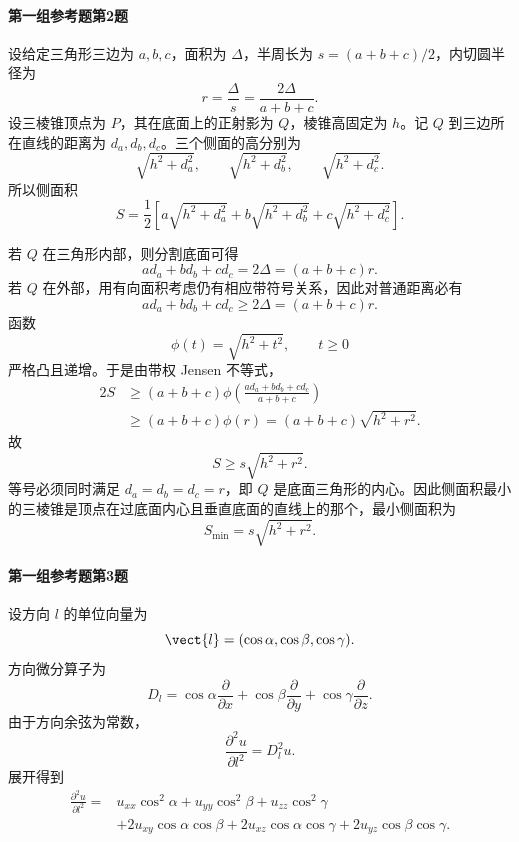 \paragraph{第一组参考题第2题}
\begin{xsolution}
设给定三角形三边为 $a,b,c$，面积为 $\Delta$，半周长为 $s=(a+b+c)/2$，内切圆半径为
\[
  r=\frac{\Delta}{s}=
  \frac{2\Delta}{a+b+c}.
\]
设三棱锥顶点为 $P$，其在底面上的正射影为 $Q$，棱锥高固定为 $h$。记 $Q$ 到三边所在直线的距离为 $d_a,d_b,d_c$。三个侧面的高分别为
\[
  \sqrt{h^2+d_a^2},
  \qquad
  \sqrt{h^2+d_b^2},
  \qquad
  \sqrt{h^2+d_c^2}.
\]
所以侧面积
\[
  S=\frac12\left[
  a\sqrt{h^2+d_a^2}
  +b\sqrt{h^2+d_b^2}
  +c\sqrt{h^2+d_c^2}
  \right].
\]

若 $Q$ 在三角形内部，则分割底面可得
\[
  ad_a+bd_b+cd_c=2\Delta=(a+b+c)r.
\]
若 $Q$ 在外部，用有向面积考虑仍有相应带符号关系，因此对普通距离必有
\[
  ad_a+bd_b+cd_c\ge2\Delta=(a+b+c)r.
\]
函数
\[
  \phi(t)=\sqrt{h^2+t^2},\qquad t\ge0
\]
严格凸且递增。于是由带权 Jensen 不等式，
\[
\begin{aligned}
  2S
  &\ge(a+b+c)
  \phi\left(\frac{ad_a+bd_b+cd_c}{a+b+c}\right)\\
  &\ge(a+b+c)\phi(r)
  =(a+b+c)\sqrt{h^2+r^2}.
\end{aligned}
\]
故
\[
  S\ge s\sqrt{h^2+r^2}.
\]
等号必须同时满足 $d_a=d_b=d_c=r$，即 $Q$ 是底面三角形的内心。因此侧面积最小的三棱锥是顶点在过底面内心且垂直底面的直线上的那个，最小侧面积为
\[
  S_{\min}=s\sqrt{h^2+r^2}.
\]
\end{xsolution}

\paragraph{第一组参考题第3题}
\begin{xsolution}
设方向 $l$ 的单位向量为
\[
  \vect{l}=(\cos\alpha,\cos\beta,\cos\gamma).
\]
方向微分算子为
\[
  D_l=\cos\alpha\frac{\partial}{\partial x}
  +\cos\beta\frac{\partial}{\partial y}
  +\cos\gamma\frac{\partial}{\partial z}.
\]
由于方向余弦为常数，
\[
  \frac{\partial^2u}{\partial l^2}=D_l^2u.
\]
展开得到
\[
\begin{aligned}
  \frac{\partial^2u}{\partial l^2}
  ={}&u_{xx}\cos^2\alpha
  +u_{yy}\cos^2\beta
  +u_{zz}\cos^2\gamma\\
  &+2u_{xy}\cos\alpha\cos\beta
  +2u_{xz}\cos\alpha\cos\gamma
  +2u_{yz}\cos\beta\cos\gamma.
\end{aligned}
\]
\end{xsolution}

